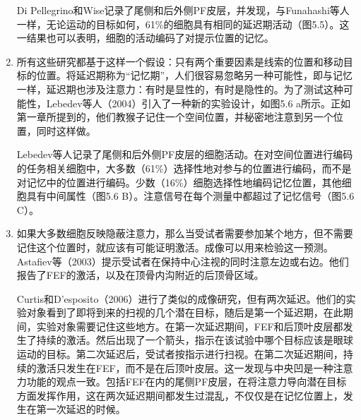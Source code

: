 \begin{enumerate}
	Di Pellegrino和Wise记录了尾侧和后外侧PF皮层，并发现，与Funahashi等人一样，无论运动的目标如何，61\%的细胞具有相同的延迟期活动（图5.5）。这一结果也可以表明，细胞的活动编码了对提示位置的记忆。
	\item 所有这些研究都基于这样一个假设：只有两个重要因素是线索的位置和移动目标的位置。将延迟期称为“记忆期”，人们很容易忽略另一种可能性，即与记忆一样，延迟期也涉及注意力：有时是显性的，有时是隐性的。为了测试这种可能性，Lebedev等人（2004）引入了一种新的实验设计，如图5.6 a所示。正如第一章所提到的，他们教猴子记住一个空间位置，并秘密地注意到另一个位置，同时这样做。
	
	Lebedev等人记录了尾侧和后外侧PF皮层的细胞活动。在对空间位置进行编码的任务相关细胞中，大多数（61\%）选择性地对参与的位置进行编码，而不是对记忆中的位置进行编码。少数（16\%）细胞选择性地编码记忆位置，其他细胞具有中间属性（图5.6 B）。注意信号在每个测量中都超过了记忆信号（图5.6 C）。
	\item 如果大多数细胞反映隐蔽注意力，那么当受试者需要参加某个地方，但不需要记住这个位置时，就应该有可能证明激活。成像可以用来检验这一预测。Astafiev等（2003）提示受试者在保持中心注视的同时注意左边或右边。他们报告了FEF的激活，以及在顶骨内沟附近的后顶骨区域。
	
	Curtis和D’esposito（2006）进行了类似的成像研究，但有两次延迟。他们的实验对象看到了即将到来的扫视的几个潜在目标，随后是第一个延迟期，在此期间，实验对象需要记住这些地方。在第一次延迟期间，FEF和后顶叶皮层都发生了持续的激活。然后出现了一个箭头，指示在该试验中哪个目标应该是眼球运动的目标。第二次延迟后，受试者按指示进行扫视。在第二次延迟期间，持续的激活只发生在FEF，而不是在后顶叶皮层。这一发现与中央凹是一种注意力功能的观点一致。包括FEF在内的尾侧PF皮层，在将注意力导向潜在目标方面发挥作用，这在两次延迟期间都发生过混乱，不仅仅是在记忆位置上，发生在第一次延迟的时候。
\end{enumerate}
